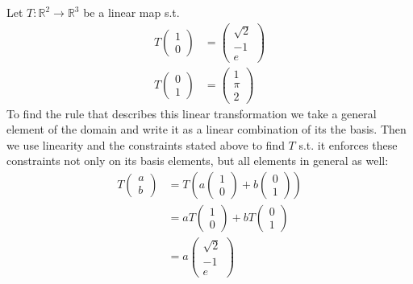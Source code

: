 \begin{exm}\label{exm-matrix-rep-linear-map}
	Let $T:\mathbb{R}^2\to\mathbb{R}^3$ be a linear map s.t.
	\begin{align*}
		T\begin{pmatrix}
			1 \\ 0
		\end{pmatrix} & =\begin{pmatrix}
			\sqrt{2} \\ -1 \\ e
		\end{pmatrix} \\
		T\begin{pmatrix}
			0 \\ 1
		\end{pmatrix} & =\begin{pmatrix}
			1 \\ \pi \\ 2
		\end{pmatrix}
	\end{align*}
	To find the rule that describes this linear transformation we take a general
	element of the domain and write it as a linear combination of its the basis.
	Then we use linearity and the constraints stated above to find $T$ s.t. it
	enforces these constraints not only on its basis elements, but all elements
	in general as well:
	\begin{align*}
		T\begin{pmatrix}
			a \\ b
		\end{pmatrix} & =
		T\left(a\begin{pmatrix}
			1 \\ 0
		\end{pmatrix}+b\begin{pmatrix}
			0 \\ 1
		\end{pmatrix}\right)                     \\
		                             & =aT\begin{pmatrix}
			1 \\ 0
		\end{pmatrix}+bT\begin{pmatrix}
			0 \\ 1
		\end{pmatrix} \\
		                             & =a\begin{pmatrix}
			\sqrt{2} \\ -1 \\ e

\end{pmatrix}
\end{align*}
\end{exm}
